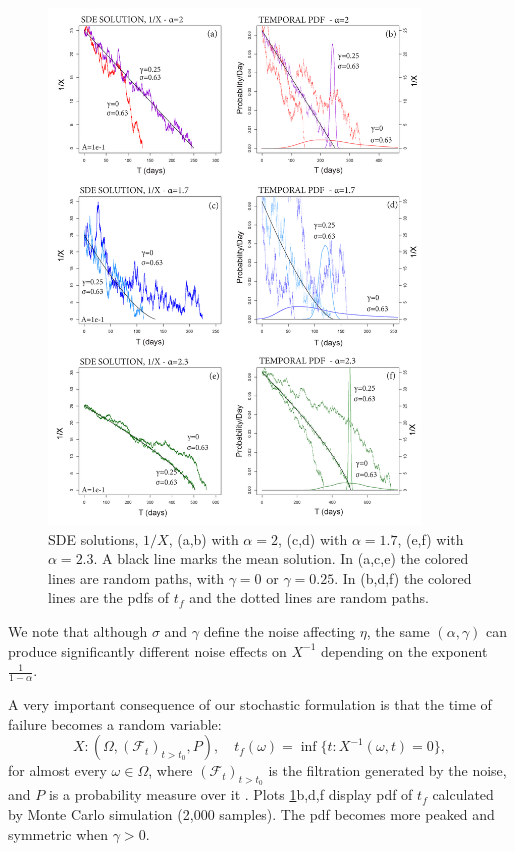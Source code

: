 \documentclass{article}
\begin{document}
\begin{figure}[H]
\centering
\includegraphics[width=0.88\textwidth]{Fig2_plusX.png}
\caption{SDE solutions, $1/X$, (a,b) with $\alpha=2$, (c,d) with $\alpha=1.7$, (e,f) with $\alpha=2.3$. A black line marks the mean solution. In (a,c,e) the colored lines are random paths, with $\gamma=0$ or $\gamma=0.25$. In (b,d,f) the colored lines are the pdfs of $t_f$ and the dotted lines are random paths.}
\label{Fig2}
\end{figure}

We note that although $\sigma$ and $\gamma$ define the noise affecting $\eta$, the same $(\alpha,\gamma)$ can produce significantly different noise effects on $X^{-1}$ depending on the exponent $\frac{1}{1-\alpha}$.

A very important consequence of our stochastic formulation is that the time of failure becomes a random variable:
$$X:\left(\Omega, (\mathcal F_t)_{t>t_0}, P\right), \quad t_f(\omega)=\inf\{t: X^{-1}(\omega,t)=0\},$$for almost every $\omega\in\Omega$, where $(\mathcal F_t)_{t>t_0}$ is the filtration generated by the noise, and $P$ is a probability measure over it \citep{Karatzas1991}. Plots \ref{Fig2}b,d,f display pdf of $t_f$ calculated by Monte Carlo simulation (2,000 samples). The pdf becomes more peaked and symmetric when $\gamma>0$.
\end{document}

